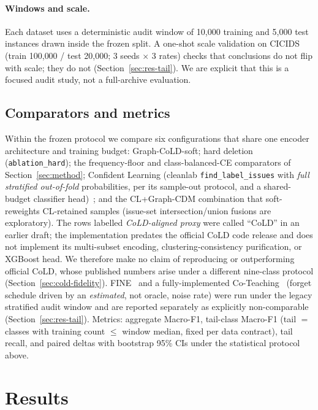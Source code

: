 \documentclass[pdflatex,referee,lineno,sn-basic,Numbered]{sn-jnl}
\begin{document}
\paragraph{Windows and scale.}
Each dataset uses a deterministic audit window of 10{,}000 training and 5{,}000
test instances drawn inside the frozen split. A one-shot scale validation on
CICIDS (train 100{,}000 / test 20{,}000; 3 seeds $\times$ 3 rates) checks that
conclusions do not flip with scale; they do not (Section~\ref{sec:res-tail}).
We are explicit that this is a focused audit study, not a full-archive
evaluation.

\subsection{Comparators and metrics}
Within the frozen protocol we compare six configurations that share one encoder
architecture and training budget: Graph-CoLD-soft; hard deletion
(\texttt{ablation\_hard}); the frequency-floor and class-balanced-CE
comparators of Section~\ref{sec:method}; Confident Learning
(cleanlab \texttt{find\_label\_issues} with \emph{full stratified out-of-fold}
probabilities, per its sample-out protocol, and a shared-budget classifier
head)~\cite{northcutt2021confident}; and the CL{+}Graph-CDM combination that
soft-reweights CL-retained samples (issue-set intersection/union fusions are
exploratory). The rows labelled \emph{CoLD-aligned proxy} were called ``CoLD''
in an earlier draft; the implementation predates the official CoLD code release
and does not implement its multi-subset encoding, clustering-consistency
purification, or XGBoost head. We therefore make no claim of reproducing or
outperforming official CoLD, whose published numbers arise under a different
nine-class protocol (Section~\ref{sec:cold-fidelity}). FINE~\cite{kim2021fine}
and a fully-implemented Co-Teaching~\cite{han2018coteaching} (forget schedule
driven by an \emph{estimated}, not oracle, noise rate) were run under the legacy
stratified audit window and are reported separately as explicitly
non-comparable (Section~\ref{sec:res-tail}). Metrics: aggregate Macro-F1,
tail-class Macro-F1 (tail $=$ classes with training count $\le$ window median,
fixed per data contract), tail recall, and paired deltas with bootstrap 95\%
CIs under the statistical protocol above.

\section{Results}
\label{sec:results}
\end{document}
